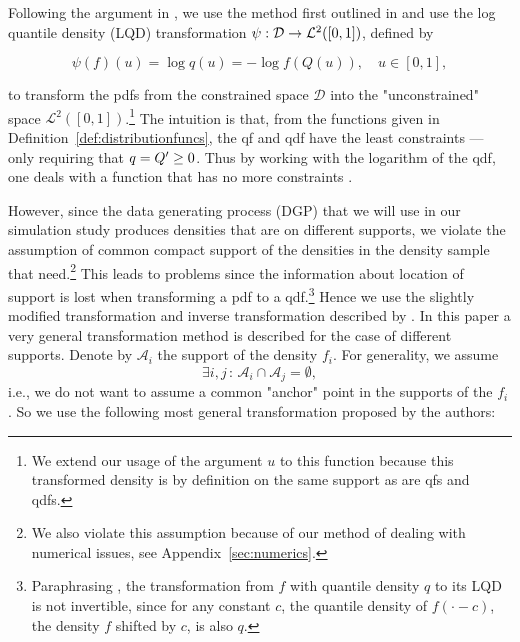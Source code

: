 Following the argument in \textcite{KokoszkaEtAl2019}, we use the method first outlined
in \textcite{PetersenMüller2016} and use the log quantile density (LQD) transformation
$\psi : \nobreak \mathcal{D} \to \mathcal{L}^2([0,1])$, defined by

\begin{equation}
    \label{eq:lqd_definition}
    \psi (f)(u) = \log q(u) = -\log f(Q(u)), \quad u \in [0,1],
\end{equation}

to transform the pdfs from the constrained space $\mathcal{D}$ into the "unconstrained"
space $\mathcal{L}^2([0,1])$.\footnote{We extend our usage of the argument $u$ to this
function because this transformed density is by definition on the same support as are
qfs and qdfs.} The intuition is that, from the functions given in
Definition~\ref{def:distributionfuncs}, the qf and qdf have the least constraints ---
only requiring that $q = \nobreak Q' \geq \nobreak 0$. Thus by working with the logarithm
of the qdf, one deals with a function that has no more constraints \parencite[cf.][]{KokoszkaEtAl2019}.

However, since the data generating process (DGP) that we will use in our simulation study
produces densities that are on different supports, we violate the assumption of common
compact support of the densities in the density sample that \textcite{PetersenMüller2016}
need.\footnote{We also violate this assumption because of our method of dealing with
numerical issues, see Appendix~\ref{sec:numerics}.} This leads to problems since the information
about location of support is lost when transforming a pdf to a qdf.\footnote{Paraphrasing
\textcite{KokoszkaEtAl2019}, the transformation from $f$ with quantile density $q$ to
its LQD is not invertible, since for any constant $c$, the quantile density of
$f(\cdot - c)$, the density $f$ shifted by $c$, is also $q$.}
Hence we use the slightly modified transformation and inverse transformation described
by \textcite{KokoszkaEtAl2019}. In this paper a very general transformation method is
described for the case of different supports. Denote by $\mathcal{A}_i$ the support of
the density $f_i$. For generality, we assume
\begin{equation*}
    \exists i, j \, : \, \mathcal{A}_i \cap \mathcal{A}_j = \emptyset,
\end{equation*}
i.e., we do not want to assume a common "anchor" point in the supports of the $f_i$. So
we use the following most general transformation proposed by the authors:

